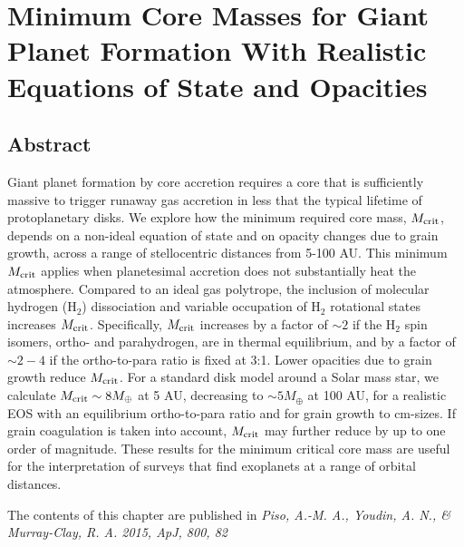 
\chapter{Minimum Core Masses for Giant Planet Formation With Realistic Equations of State and Opacities}

\section*{Abstract}

Giant planet formation by core accretion requires a core that is sufficiently massive to trigger runaway gas accretion in less that the typical lifetime of protoplanetary disks. We explore how the minimum required core mass, $M_{\rm crit}$, depends on a non-ideal equation of state and on opacity changes due to grain growth, across a range of stellocentric distances from 5-100 AU. This minimum $M_{\rm crit}$ applies when planetesimal accretion does not substantially heat the atmosphere.  Compared to an ideal gas polytrope, the inclusion of molecular hydrogen (H$_2$) dissociation and variable occupation of H$_2$ rotational states increases $M_{\rm crit}$.  Specifically, $M_{\rm crit}$ increases by a factor of $\sim$$2$ if the H$_2$ spin isomers, ortho- and parahydrogen, are in thermal equilibrium, and by a factor of $\sim$$2-4$ if the ortho-to-para ratio is fixed at 3:1.  Lower opacities due to grain growth reduce $M_{\rm crit}$. For a standard disk model around a Solar mass star, we calculate $M_{\rm crit} \sim 8 M_{\oplus}$ at 5 AU, decreasing to $\sim$$5 M_{\oplus}$ at 100 AU, for a realistic EOS with an equilibrium ortho-to-para ratio and for grain growth to cm-sizes. If grain coagulation is taken into account, $M_{\rm crit}$ may further reduce by up to one order of magnitude. These results for the minimum critical core mass are useful for the interpretation of surveys that find exoplanets at a range of orbital distances.

\noindent The contents of this chapter are published in \textit{Piso, A.-M. A., Youdin, A. N., \& Murray-Clay, R. A. 2015, ApJ, 800, 82}

